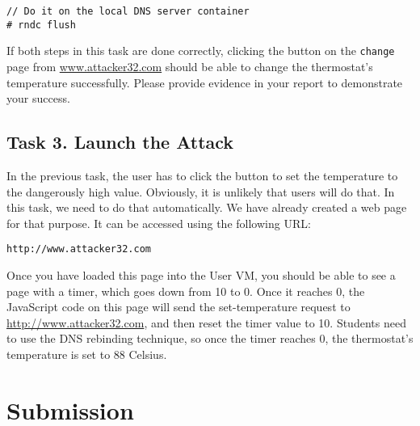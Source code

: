 \begin{lstlisting}
// Do it on the local DNS server container
# rndc flush
\end{lstlisting}
 
 
If both steps in this task are done correctly, clicking the button 
on the \texttt{change} page from \url{www.attacker32.com} should be able to change
the thermostat's temperature successfully. Please provide evidence in your report to
demonstrate your success.


\subsection{Task 3. Launch the Attack}

In the previous task, the user has to click the button to set the 
temperature to the dangerously high value. Obviously, it is unlikely that users will 
do that.  In this task, we need to do that automatically. We have already created 
a web page for that purpose. It can be accessed using the following URL:


\begin{lstlisting}
http://www.attacker32.com
\end{lstlisting}
 

Once you have loaded this page into the User VM, you should be able to see a page with a 
timer, which goes down from 10 to 0. Once it reaches 0, the JavaScript code 
on this page will send the set-temperature request to 
\url{http://www.attacker32.com}, and then reset the timer value to 10. 
Students need to use the DNS rebinding technique, so
once the timer reaches 0, the thermostat's temperature is set to 
88 Celsius. 



\section{Submission}

\seedsubmission



